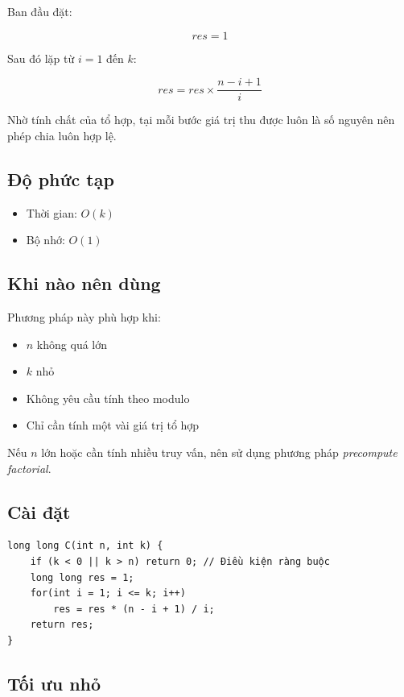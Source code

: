 Ban đầu đặt:

\[
res = 1
\]

Sau đó lặp từ $i = 1$ đến $k$:

\[
res = res \times \frac{n-i+1}{i}
\]

Nhờ tính chất của tổ hợp, tại mỗi bước giá trị thu được luôn là số nguyên nên phép chia luôn hợp lệ.

\subsection*{Độ phức tạp}

\begin{itemize}
\item Thời gian: $O(k)$
\item Bộ nhớ: $O(1)$
\end{itemize}

\subsection*{Khi nào nên dùng}

Phương pháp này phù hợp khi:

\begin{itemize}
\item $n$ không quá lớn
\item $k$ nhỏ
\item Không yêu cầu tính theo modulo
\item Chỉ cần tính một vài giá trị tổ hợp
\end{itemize}

Nếu $n$ lớn hoặc cần tính nhiều truy vấn, nên sử dụng phương pháp \textit{precompute factorial}.

\subsection*{Cài đặt}

\begin{tcolorbox}
\begin{verbatim}
long long C(int n, int k) {
    if (k < 0 || k > n) return 0; // Điều kiện ràng buộc
    long long res = 1;
    for(int i = 1; i <= k; i++)
        res = res * (n - i + 1) / i;
    return res;
}
\end{verbatim}
\end{tcolorbox}

\subsection*{Tối ưu nhỏ}

